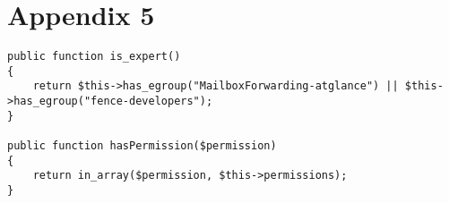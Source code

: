 \section*{Appendix 5}
\label{sec:app5}

\begin{lstlisting}
public function is_expert() 
{
    return $this->has_egroup("MailboxForwarding-atglance") || $this->has_egroup("fence-developers");
}

public function hasPermission($permission)
{
    return in_array($permission, $this->permissions);
}
\end{lstlisting}